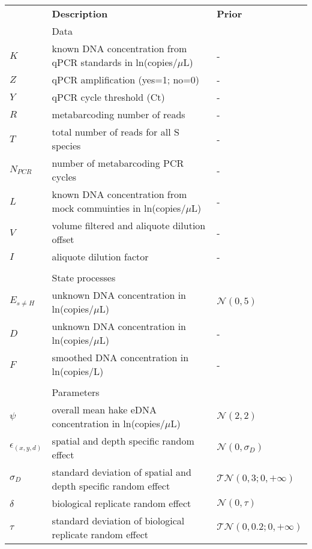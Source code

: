 \documentclass{article}
\begin{document}
\begin{table}[h]
    \centering
    \begin{tabular}{lll}
         & \textbf{Description} & \textbf{Prior} \\
&Data & \\
\hline
$K$ & known DNA concentration from qPCR standards in ln(copies/$\mu$L) & - \\
$Z$ & qPCR amplification (yes=1; no=0) & - \\
$Y$ & qPCR cycle threshold (Ct) & - \\
$R$ & metabarcoding number of reads & - \\
$T$ & total number of reads for all S species & - \\
$N_{PCR}$ & number of metabarcoding PCR cycles & - \\
$L$ & known DNA concentration from mock commuinties in ln(copies/$\mu$L) & - \\
$V$ & volume filtered and aliquote dilution offset & -\\
$I$ & aliquote dilution factor & -\\

&&\\
&State processes&\\
\hline
$E_{s\neq H}$ & unknown DNA concentration in ln(copies/$\mu$L) & $\mathcal{N}(0,5)$\\
$D$ & unknown DNA concentration in ln(copies/$\mu$L)& - \\
$F$ & smoothed DNA concentration in ln(copies/L) & - \\
&&\\

&Parameters&\\
\hline
$\psi$& overall mean hake eDNA concentration in ln(copies/$\mu$L) & $\mathcal{N}(2,2)$\\
$\epsilon_{(x,y,d)}$& spatial and depth specific random effect & $\mathcal{N}(0,\sigma_D)$\\
$\sigma_D $& standard deviation of spatial and depth specific random effect & $\mathcal{TN}(0,3;0, +\infty)$\\

$\delta$& biological replicate random effect & $\mathcal{N}(0,\tau)$\\
$\tau$& standard deviation of biological replicate random effect & $\mathcal{TN}(0,0.2;0, +\infty)$\\


\end{tabular}
\end{table}
\end{document}
